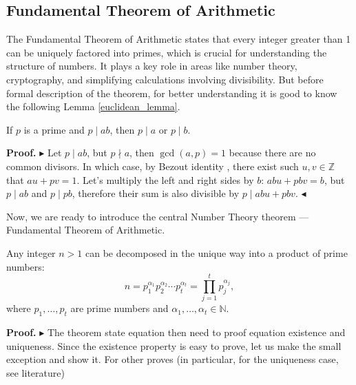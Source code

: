 \documentclass[../lecture-notes-148x210.tex]{subfiles}
\begin{document}
\subsection{Fundamental Theorem of Arithmetic}
The Fundamental Theorem of Arithmetic states that every integer greater than 1 can be uniquely factored into primes, which is crucial for understanding the structure of numbers. 
It plays a key role in areas like number theory, cryptography, and simplifying calculations involving divisibility. 
But before formal description of the theorem, for better understanding it is good to know the following Lemma \ref{euclidean_lemma}.

\begin{lemma}[Euclidean] \label{euclidean_lemma}
    If $p$ is a prime and $p \mid ab$, then $p \mid a$ or $p \mid b$.
\end{lemma}

\textbf{Proof.} 
$\blacktriangleright$
Let $p \mid ab$, but $ p \nmid a$, then $\gcd(a, p) = 1$ because there are no common divisors.
In which case, by Bezout identity , there exist such $u, v \in \mathbb{Z}$ that $au + pv = 1$.
Let's multiply the left and right sides by $b$: $abu + pbv = b$, but $p \mid ab$ and $p \mid pb$, therefore their sum is also divisible by $p \mid abu + pbv$. 
$\blacktriangleleft$

Now, we are ready to introduce the central Number Theory theorem --- Fundamental
Theorem of Arithmetic.

\begin{theorem}\label{th:fundamental_arithmetic}
    Any integer $n>1$ can be decomposed in the unique way into a product of prime numbers:
    \begin{equation*}
        n = p_1^{\alpha_1}p_2^{\alpha_2}\cdots p_t^{\alpha_t} = \prod_{j=1}^t p_j^{\alpha_j},
    \end{equation*}
    where $p_1,\dots,p_t$ are prime numbers and $\alpha_1,\dots,\alpha_t \in \mathbb{N}$.
\end{theorem}

\textbf{Proof.} 
$\blacktriangleright$  
The theorem state equation then need to proof equation existence and uniqueness. Since the existence property is 
easy to prove, let us make the small exception and show it. For other proves (in particular, for the uniqueness case, see literature)
\end{document}
